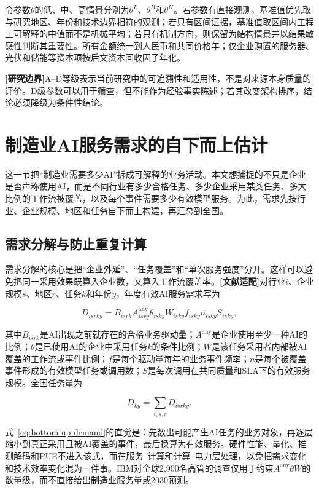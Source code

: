 \documentclass[preprint]{elsarticle}
\newcommand{\adapted}{\textcolor{violet!75!black}{\textbf{[文献适配]}}}
\newcommand{\boundary}{\textcolor{black!65}{\textbf{[研究边界]}}}
\begin{document}
令参数$\theta$的低、中、高情景分别为$\theta^{L}$、$\theta^{B}$和$\theta^{H}$。若参数有直接观测，基准值优先取与研究地区、年份和技术边界相符的观测；若只有区间证据，基准值取区间内工程上可解释的中值而不是机械平均；若只有机制方向，则保留为结构情景并以结果敏感性判断其重要性。所有金额统一到人民币和共同价格年；仅企业购置的服务器、光伏和储能等资本项按后文资本回收因子年化。

\boundary A--D等级表示当前研究中的可追溯性和适用性，不是对来源本身质量的评价。D级参数可以用于筛查，但不能作为经验事实陈述；若其改变架构排序，结论必须降级为条件性结论。

\section{制造业AI服务需求的自下而上估计}

这一节把“制造业需要多少AI”拆成可解释的业务活动。本文想捕捉的不只是企业是否声称使用AI，而是不同行业有多少合格任务、多少企业采用某类任务、多大比例的工作流被覆盖，以及每个事件需要多少有效模型服务。为此，需求先按行业、企业规模、地区和任务自下而上构建，再汇总到全国。

\subsection{需求分解与防止重复计算}

需求分解的核心是把“企业外延”、“任务覆盖”和“单次服务强度”分开。这样可以避免把同一采用效果既算入企业数，又算入工作流覆盖率。\adapted 对行业$i$、企业规模$s$、地区$r$、任务$k$和年份$y$，年度有效AI服务需求写为

\begin{equation}
 D_{isrky}=B_{isrk}
 A^{\mathrm{any}}_{isry}\theta_{isky}W_{isky}
 f_{isky}n_{isky}S_{isky},
 \label{eq:bottom-up-demand}
\end{equation}

其中$B_{isrk}$是AI出现之前就存在的合格业务驱动量；$A^{\mathrm{any}}$是企业使用至少一种AI的比例；$\theta$是已使用AI的企业中采用任务$k$的条件比例；$W$是该任务采用者内部被AI覆盖的工作流或事件比例；$f$是每个驱动量每年的业务事件频率；$n$是每个被覆盖事件形成的有效模型任务或调用数；$S$是每次调用在共同质量和SLA下的有效服务规模。全国任务量为

\begin{equation}
 D_{ky}=\sum_{i,s,r}D_{isrky}.
 \label{eq:national-bottom-up-demand}
\end{equation}

式~\eqref{eq:bottom-up-demand}的直觉是：先数出可能产生AI任务的业务对象，再逐层缩小到真正采用且被AI覆盖的事件，最后换算为有效服务。硬件性能、量化、推测解码和PUE不进入该式，而在服务--计算和计算--电力层处理，以免把需求变化和技术效率变化混为一件事。IBM对全球2,900名高管的调查仅用于约束$A^{\mathrm{any}}\theta W$的数量级，而不直接给出制造业服务量或2030预测\cite{ibm2025}。
\end{document}
